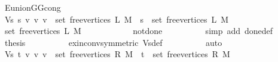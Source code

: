 \begin{isabellebody}
\ E{\isacharunderscore}{\kern0pt}union{\isacharunderscore}{\kern0pt}G{}{\isacharunderscore}{\kern0pt}G{}{\isacharunderscore}{\kern0pt}cong\isanewline
\ \ \ \ \ \ \isacommand{{\isachardot}{\kern0pt}}\isamarkupfalse%
\isanewline
\ \ \ \ \isamarkupfalse%
\ \isamarkupfalse%
\ {\isachardoublequoteopen}Vs\ {\isacharbraceleft}{\kern0pt}{\isacharbraceleft}{\kern0pt}s{\isacharcomma}{\kern0pt}\ v{\isacharbraceright}{\kern0pt}\ {\isacharbar}{\kern0pt}v{\isachardot}{\kern0pt}\ v\ {\isasymin}\ set\ {\isacharparenleft}{\kern0pt}free{\isacharunderscore}{\kern0pt}vertices\ L\ M{\isacharparenright}{\kern0pt}{\isacharbraceright}{\kern0pt}\ {\isacharequal}{\kern0pt}\ {\isacharbraceleft}{\kern0pt}s{\isacharbraceright}{\kern0pt}\ {\isasymunion}\ set\ {\isacharparenleft}{\kern0pt}free{\isacharunderscore}{\kern0pt}vertices\ L\ M{\isacharparenright}{\kern0pt}{\isachardoublequoteclose}\isanewline
\ \ \ \ \isamarkupfalse%
\ {\isacharminus}{\kern0pt}\isanewline
\ \ \ \ \ \ \isamarkupfalse%
\ {\isachardoublequoteopen}set\ {\isacharparenleft}{\kern0pt}free{\isacharunderscore}{\kern0pt}vertices\ L\ M{\isacharparenright}{\kern0pt}\ {\isasymnoteq}\ {\isacharbraceleft}{\kern0pt}{\isacharbraceright}{\kern0pt}{\isachardoublequoteclose}\isanewline
\ \ \ \ \ \ \ \ \isamarkupfalse%
\ not{\isacharunderscore}{\kern0pt}done{\isacharunderscore}{\kern0pt}{}\isanewline
\ \ \ \ \ \ \ \ \isamarkupfalse%
\ {\isacharparenleft}{\kern0pt}simp\ add{\isacharcolon}{\kern0pt}\ done{\isacharunderscore}{\kern0pt}{}{\isacharunderscore}{\kern0pt}def{\isacharparenright}{\kern0pt}\isanewline
\ \ \ \ \ \ \isamarkupfalse%
\ {\isacharquery}{\kern0pt}thesis\isanewline
\ \ \ \ \ \ \ \ \isamarkupfalse%
\ ex{\isacharunderscore}{\kern0pt}in{\isacharunderscore}{\kern0pt}conv{\isacharbrackleft}{\kern0pt}symmetric{\isacharbrackright}{\kern0pt}\ Vs{\isacharunderscore}{\kern0pt}def\isanewline
\ \ \ \ \ \ \ \ \isamarkupfalse%
\ auto\isanewline
\ \ \ \ \isamarkupfalse%
\isanewline
\ \ \ \ \isamarkupfalse%
\ \isamarkupfalse%
\ {\isachardoublequoteopen}Vs\ {\isacharbraceleft}{\kern0pt}{\isacharbraceleft}{\kern0pt}t{\isacharcomma}{\kern0pt}\ v{\isacharbraceright}{\kern0pt}\ {\isacharbar}{\kern0pt}v{\isachardot}{\kern0pt}\ v\ {\isasymin}\ set\ {\isacharparenleft}{\kern0pt}free{\isacharunderscore}{\kern0pt}vertices\ R\ M{\isacharparenright}{\kern0pt}{\isacharbraceright}{\kern0pt}\ {\isacharequal}{\kern0pt}\ {\isacharbraceleft}{\kern0pt}t{\isacharbraceright}{\kern0pt}\ {\isasymunion}\ set\ {\isacharparenleft}{\kern0pt}free{\isacharunderscore}{\kern0pt}vertices\ R\ M{\isacharparenright}{\kern0pt}{\isachardoublequoteclose}\isanewline

\end{isabellebody}
